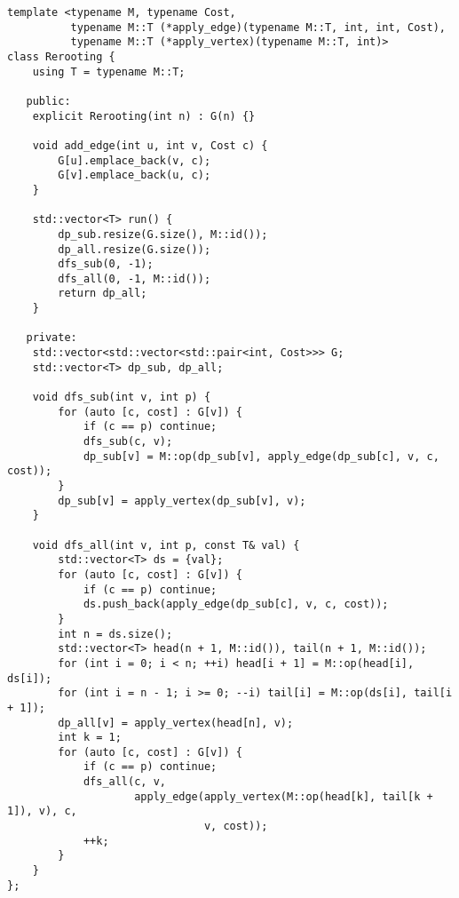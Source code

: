 \begin{lstlisting}
template <typename M, typename Cost,
          typename M::T (*apply_edge)(typename M::T, int, int, Cost),
          typename M::T (*apply_vertex)(typename M::T, int)>
class Rerooting {
    using T = typename M::T;

   public:
    explicit Rerooting(int n) : G(n) {}

    void add_edge(int u, int v, Cost c) {
        G[u].emplace_back(v, c);
        G[v].emplace_back(u, c);
    }

    std::vector<T> run() {
        dp_sub.resize(G.size(), M::id());
        dp_all.resize(G.size());
        dfs_sub(0, -1);
        dfs_all(0, -1, M::id());
        return dp_all;
    }

   private:
    std::vector<std::vector<std::pair<int, Cost>>> G;
    std::vector<T> dp_sub, dp_all;

    void dfs_sub(int v, int p) {
        for (auto [c, cost] : G[v]) {
            if (c == p) continue;
            dfs_sub(c, v);
            dp_sub[v] = M::op(dp_sub[v], apply_edge(dp_sub[c], v, c, cost));
        }
        dp_sub[v] = apply_vertex(dp_sub[v], v);
    }

    void dfs_all(int v, int p, const T& val) {
        std::vector<T> ds = {val};
        for (auto [c, cost] : G[v]) {
            if (c == p) continue;
            ds.push_back(apply_edge(dp_sub[c], v, c, cost));
        }
        int n = ds.size();
        std::vector<T> head(n + 1, M::id()), tail(n + 1, M::id());
        for (int i = 0; i < n; ++i) head[i + 1] = M::op(head[i], ds[i]);
        for (int i = n - 1; i >= 0; --i) tail[i] = M::op(ds[i], tail[i + 1]);
        dp_all[v] = apply_vertex(head[n], v);
        int k = 1;
        for (auto [c, cost] : G[v]) {
            if (c == p) continue;
            dfs_all(c, v,
                    apply_edge(apply_vertex(M::op(head[k], tail[k + 1]), v), c,
                               v, cost));
            ++k;
        }
    }
};

\end{lstlisting}